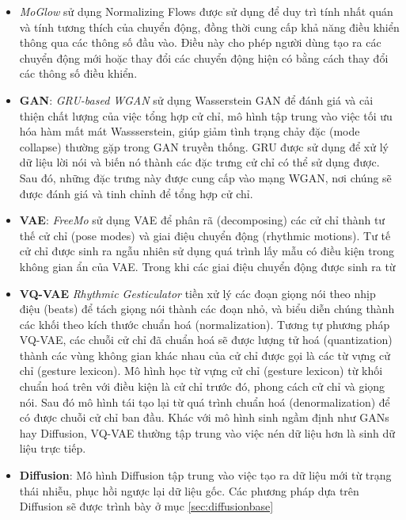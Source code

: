 \begin{itemize}
	\item \textit{MoGlow} \cite{henter2020moglow} sử dụng Normalizing Flows được sử dụng để duy trì tính nhất quán và tính tương thích của chuyển động, đồng thời cung cấp khả năng điều khiển thông qua các thông số đầu vào. Điều này cho phép người dùng tạo ra các chuyển động mới hoặc thay đổi các chuyển động hiện có bằng cách thay đổi các thông số điều khiển.
	
	\item \textbf{GAN}: \textit{GRU-based WGAN} \cite{wu2021probabilistic} sử dụng Wasserstein GAN để đánh giá và cải thiện chất lượng của việc tổng hợp cử chỉ, mô hình tập trung vào việc tối ưu hóa hàm mất mát Wassserstein, giúp giảm tình trạng chảy đặc (mode collapse) thường gặp trong GAN truyền thống. GRU được sử dụng để xử lý dữ liệu lời nói và biến nó thành các đặc trưng cử chỉ có thể sử dụng được. Sau đó, những đặc trưng này được cung cấp vào mạng WGAN, nơi chúng sẽ được đánh giá và tinh chỉnh để tổng hợp cử chỉ.
	
	\item \textbf{VAE}:  \textit{FreeMo} \cite{xu2022freeform} sử dụng VAE để phân rã (decomposing) các cử chỉ thành tư thế cử chỉ (pose modes) và giai điệu chuyển động (rhythmic motions). Tư tế cử chỉ được sinh ra ngẫu nhiên sử dụng quá trình lấy mẫu có điều kiện trong không gian ẩn của VAE. Trong khi các giai điệu chuyển động được sinh ra từ 
	
	\item \textbf{VQ-VAE} \textit{Rhythmic Gesticulator} \cite{ao2022rhythmic} tiền xử lý các đoạn giọng nói theo nhịp điệu (beats) để tách giọng nói thành các đoạn nhỏ, và biểu diễn chúng thành các khối theo kích thước chuẩn hoá (normalization). Tương tự phương pháp VQ-VAE, các chuỗi cử chỉ đã chuẩn hoá sẽ được lượng tử hoá (quantization) thành các vùng không gian khác nhau của cử chỉ được gọi là các từ vựng cử chỉ (gesture lexicon). Mô hình học từ vựng cử chỉ (gesture lexicon) từ khối chuẩn hoá trên với điều kiện là cử chỉ trước đó, phong cách cử chỉ và giọng nói. Sau đó mô hình tái tạo lại từ quá trình chuẩn hoá (denormalization) để có được chuỗi cử chỉ ban đầu. Khác với mô hình sinh ngầm định như GANs hay Diffusion, VQ-VAE thường tập trung vào việc nén dữ liệu hơn là sinh dữ liệu trực tiếp.
	
	\item \textbf{Diffusion}:  Mô hình Diffusion tập trung vào việc tạo ra dữ liệu mới từ trạng thái nhiễu, phục hồi ngược lại dữ liệu gốc. Các phương pháp dựa trên Diffusion sẽ được trình bày ở mục \autoref{sec:diffusionbase}
	
\end{itemize}



